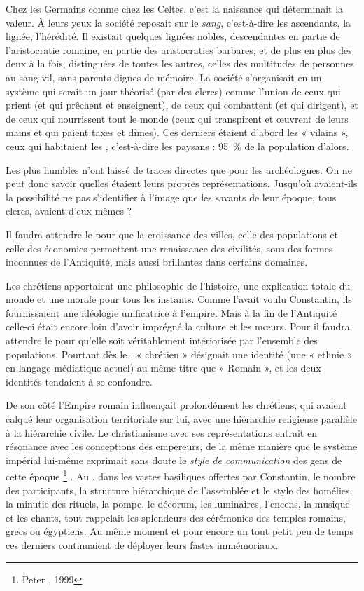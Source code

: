  Chez les Germains comme chez les Celtes, c'est la naissance qui déterminait la valeur. À leurs yeux la société reposait sur le \emph{sang}, c'est-à-dire les ascendants, la lignée, l'hérédité. Il existait quelques lignées nobles, descendantes en partie de l'aristocratie romaine, en partie des aristocraties barbares, et de plus en plus des deux à la fois, distinguées de toutes les autres, celles des multitudes de personnes au sang vil, sans parents dignes de mémoire. La société s'organisait en un système qui serait un jour théorisé (par des clercs) comme l'union de ceux qui prient (et qui prêchent et enseignent), de ceux qui combattent (et qui dirigent), et de ceux qui nourrissent tout le monde (ceux qui transpirent et œuvrent de leurs mains et qui paient taxes et dîmes). Ces derniers étaient d'abord les « vilains », ceux qui habitaient les , c'est-à-dire les paysans : 95~\% de la population d'alors.

 Les plus humbles n'ont laissé de traces directes que pour les archéologues. On ne peut donc savoir quelles étaient leurs propres représentations. Jusqu'où avaient-ils la possibilité ne pas s'identifier à l'image que les savants de leur époque, tous clercs, avaient d'eux-mêmes ?

 Il faudra attendre le  pour que la croissance des villes, celle des populations et celle des économies permettent une renaissance des civilités, sous des formes inconnues de l'Antiquité, mais aussi brillantes dans certains domaines. 
 
 Les chrétiens apportaient une philosophie de l'histoire, une explication totale du monde et une morale pour tous les instants. Comme l'avait voulu Constantin, ils fournissaient une idéologie unificatrice à l'empire. Mais à la fin de l'Antiquité celle-ci était encore loin d'avoir imprégné la culture et les mœurs. Pour  il faudra attendre le  pour qu'elle soit véritablement intériorisée par l'ensemble des populations. Pourtant dès le , « chrétien » désignait une identité (une « ethnie » en langage médiatique actuel) au même titre que « Romain », et les deux identités tendaient à se confondre. 

 De son côté l'Empire romain influençait profondément les chrétiens, qui avaient calqué leur organisation territoriale sur lui, avec une hiérarchie religieuse parallèle à la hiérarchie civile. Le christianisme avec ses représentations entrait en résonance avec les conceptions des empereurs, de la même manière que le système impérial lui-même exprimait sans doute le \emph{style de communication} des gens de cette époque
\footnote{Peter , 1999}%
. Au , dans les vastes basiliques offertes par Constantin, le nombre des participants, la structure hiérarchique de l'assemblée et le style des homélies, la minutie des rituels, la pompe, le décorum, les luminaires, l'encens, la musique et les chants, tout rappelait les splendeurs des cérémonies des temples romains, grecs ou égyptiens. Au même moment et pour encore un tout petit peu de temps ces derniers continuaient de déployer leurs fastes immémoriaux. 

